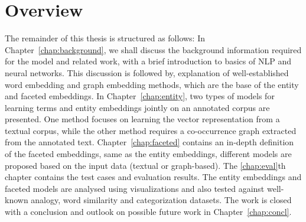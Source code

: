 

\section{Overview}
The remainder of this thesis is structured as follows: 
In Chapter~\ref{chap:background},  we shall discuss the background information required for the model and related work, with a brief introduction to  basics of NLP and neural networks. This discussion is followed by, explanation of well-established word embedding and graph embedding methods, which are the base of the entity and faceted embeddings. In Chapter~\ref{chap:entity}, two types of models for learning terms and entity embeddings jointly on an annotated corpus are presented. One method focuses on learning the vector representation from a textual corpus, while the other method requires a co-occurrence graph extracted from the annotated text.
Chapter~\ref{chap:faceted} contains an in-depth definition of the faceted embeddings, same as the entity embeddings, different models are proposed based on the input data (textual or graph-based). The \ref{chap:eval}th chapter contains the test cases and evaluation results. The entity embeddings and faceted models are analysed using visualizations and also tested against well-known analogy, word similarity and categorization datasets. The work is closed with a conclusion and outlook on possible future work in Chapter~\ref{chap:concl}. 






